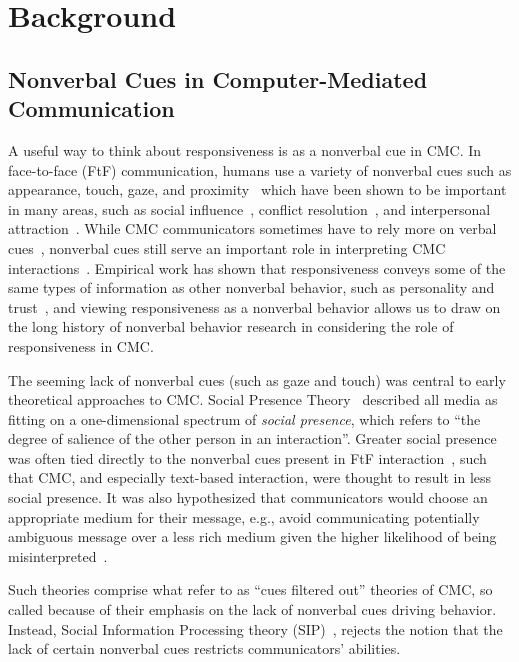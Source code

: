 \documentclass[12pt]{nuthesis}	%
\begin{document}
\chapter{Background}

\section{Nonverbal Cues in Computer-Mediated Communication}

A useful way to think about responsiveness is as a nonverbal cue in CMC. In face-to-face (FtF) communication, humans use a variety of nonverbal cues such as appearance, touch, gaze, and proximity~\citep{burgoon2016nonverbal} which have been shown to be important in many areas, such as social influence~\citep{hogg2006social}, conflict resolution~\citep{ting2001managing}, and interpersonal attraction~\citep{burgoon1991relational,erceau2007tactile}. While CMC communicators sometimes have to rely more on verbal cues~\citep{walther2005let}, nonverbal cues still serve an important role in interpreting CMC interactions~\citep{lo2008nonverbal,tidwell2002computer,walther1992interpersonal}. Empirical work has shown that responsiveness conveys some of the same types of information as other nonverbal behavior, such as personality and trust~\citep{kalman2013online}, and viewing responsiveness as a nonverbal behavior allows us to draw on the long history of nonverbal behavior research in considering the role of responsiveness in CMC.

The seeming lack of nonverbal cues (such as gaze and touch) was central to early theoretical approaches to CMC. Social Presence Theory~\citep{short1976social} described all media as fitting on a one-dimensional spectrum of \textit{social presence}, which refers to ``the degree of salience of the other person in an interaction''. Greater social presence was often tied directly to the nonverbal cues present in FtF interaction~\citep[e.g.,][]{burgoon1984relational}, such that CMC, and especially text-based interaction, were thought to result in less social presence. It was also hypothesized that communicators would choose an appropriate medium for their message, e.g., avoid communicating potentially ambiguous message over a less rich medium given the higher likelihood of being misinterpreted~\citep{daft1986organizational}.

Such theories comprise what \citet{walther2002cues} refer to as ``cues filtered out'' theories of CMC, so called because of their emphasis on the lack of nonverbal cues driving behavior. Instead, Social Information Processing theory (SIP)~\citep{walther1992interpersonal}, rejects the notion that the lack of certain nonverbal cues restricts communicators' abilities. 
\end{document}
